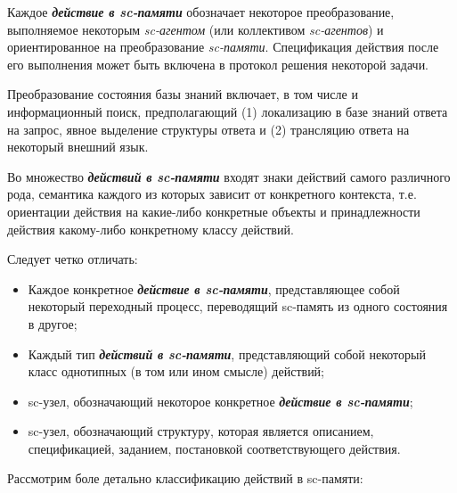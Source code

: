 Каждое \textbf{\textit{действие в sc-памяти}} обозначает некоторое преобразование, выполняемое некоторым \textit{sc-агентом} (или коллективом \textit{sc-агентов}) и ориентированное на преобразование \textit{sc-памяти}. Спецификация действия после его выполнения может быть включена в протокол решения некоторой задачи. 
	
Преобразование состояния базы знаний включает, в том числе и информационный поиск, предполагающий (1) локализацию в базе знаний ответа на запрос, явное выделение структуры ответа и (2) трансляцию ответа на некоторый внешний язык.

Во множество \textbf{\textit{действий в sc-памяти}} входят знаки действий самого различного рода, семантика каждого из которых зависит от конкретного контекста, т.е. ориентации действия на какие-либо конкретные объекты и принадлежности действия какому-либо конкретному классу действий.

Следует четко отличать:
\begin{itemize}
	\item Каждое конкретное \textbf{\textit{действие в sc-памяти}}, представляющее собой некоторый переходный процесс, переводящий sc-память из одного состояния в другое;
	\item Каждый тип \textbf{\textit{действий в sc-памяти}}, представляющий собой некоторый класс однотипных (в том или ином смысле) действий;
	\item sc-узел, обозначающий некоторое конкретное \textbf{\textit{действие в sc-памяти}};
	\item sc-узел, обозначающий структуру, которая является описанием, спецификацией, заданием, постановкой соответствующего действия.
\end{itemize}

Рассмотрим боле детально классификацию действий в sc-памяти:

